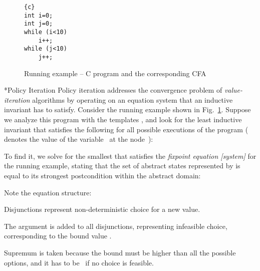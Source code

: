 \documentclass{llncs}
\makeatletter
\newcommand{\cfa}{\textsc{CFA}\xspace}
\renewcommand{\paragraph}{\@startsection{paragraph}{4}{\z@}{0.8ex \@plus 0ex \@minus 1ex}{-1em}{\normalfont\normalsize\bfseries}}
\makeatother
\begin{document}
\begin{figure}[t]
    \centering
    \begin{minipage}{0.35\linewidth}
        \begin{lstlisting}{c}
int i=0;
int j=0;
while (i<10)
    i++;
while (j<10)
    j++;
        \end{lstlisting}
    \end{minipage}
    \begin{minipage}{0.5\linewidth}
        \centering
     \end{minipage}
    \vspace{-2mm}
    \caption{Running example -- C program and the corresponding \cfa}
    \label{fig:running_example}
\end{figure}

\paragraph*{Policy Iteration} Policy iteration addresses the convergence problem
of \emph{value-iteration} algorithms by operating on an equation system that an
inductive invariant has to satisfy.
Consider the running example shown in Fig.~\ref{fig:running_example}.
Suppose we analyze this program with the
templates , and look for the least inductive invariant
 that satisfies the following for all
possible
executions of the program ( denotes the value of the variable~ at the node~):

To find it, we solve for the smallest 
that satisfies the \emph{fixpoint equation [system]}
for the running example,
stating that the set of abstract states represented by  is equal to its strongest
postcondition within the abstract domain:

Note the equation structure:
\begin{inparaenum}[(i)]
    \item Disjunctions represent non-deterministic choice for a new value.
    \item The argument  is added to all disjunctions, representing
        infeasible choice, corresponding to the bound value .
    \item Supremum is taken because the bound must be higher than all the
        possible options, and it has to be~ if no choice is
        feasible.
\end{inparaenum}
\end{document}

